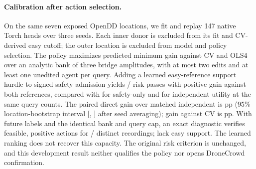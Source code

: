 \paragraph{Calibration after action selection.}
On the same seven exposed OpenDD locations, we fit and replay 147 native
Torch heads over three seeds. Each inner donor is excluded from its fit
and CV-derived easy cutoff; the outer location is excluded from model
and policy selection. The policy maximizes predicted minimum gain against
CV and OLS4 over an analytic bank of three bridge amplitudes, with at most
two edits and at least one unedited agent per query. Adding a learned
easy-reference support hurdle to signed safety admission yields
\SelectedBridgeHurdle{}/\SelectedBridgeViews{} risk passes with positive
gain against both references, compared with \SelectedBridgeSafety{} for
safety-only and \SelectedBridgeIndependent{} for independent utility at
the same query counts. The paired direct gain over matched independent is
\SelectedBridgePoint{} pp (95\% location-bootstrap interval
[\SelectedBridgeLow{}, \SelectedBridgeHigh{}] after seed averaging); gain
against CV is \SelectedBridgeCV{} pp. With future labels and the identical
bank and query cap, an exact diagnostic verifies feasible, positive
actions for \SelectedBridgeCapacity{}/\SelectedBridgeRecordings{} distinct
recordings; \SelectedBridgeAbsent{} lack easy support. The learned ranking
does not recover this capacity. The original risk criterion is unchanged,
and this development result neither qualifies the policy nor opens
DroneCrowd confirmation.
